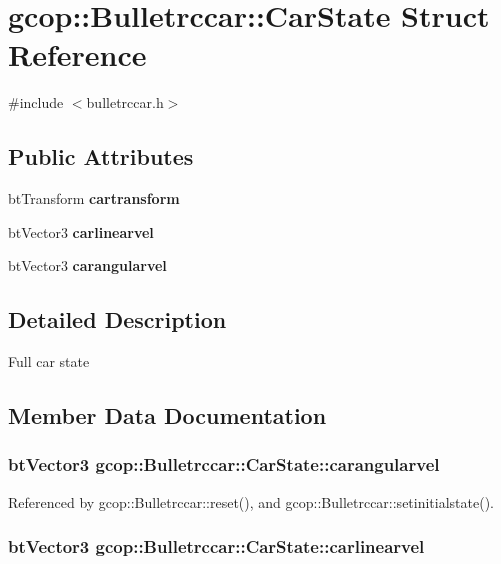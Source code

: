 \section{gcop\-:\-:\-Bulletrccar\-:\-:\-Car\-State \-Struct \-Reference}
\label{structgcop_1_1Bulletrccar_1_1CarState}


{\ttfamily \#include $<$bulletrccar.\-h$>$}

\subsection*{\-Public \-Attributes}
\begin{DoxyCompactItemize}
\item 
bt\-Transform {\bf cartransform}
\item 
bt\-Vector3 {\bf carlinearvel}
\item 
bt\-Vector3 {\bf carangularvel}
\end{DoxyCompactItemize}


\subsection{\-Detailed \-Description}
\-Full car state 

\subsection{\-Member \-Data \-Documentation}
\subsubsection[{carangularvel}]{\setlength{\rightskip}{0pt plus 5cm}bt\-Vector3 {\bf gcop\-::\-Bulletrccar\-::\-Car\-State\-::carangularvel}}\label{structgcop_1_1Bulletrccar_1_1CarState_a76d05b2f2ae6538857d0463ca8e51d31}


\-Referenced by gcop\-::\-Bulletrccar\-::reset(), and gcop\-::\-Bulletrccar\-::setinitialstate().

\subsubsection[{carlinearvel}]{\setlength{\rightskip}{0pt plus 5cm}bt\-Vector3 {\bf gcop\-::\-Bulletrccar\-::\-Car\-State\-::carlinearvel}}\label{structgcop_1_1Bulletrccar_1_1CarState_aea19046c81dd1d27e1c67d6c41573dcc}


